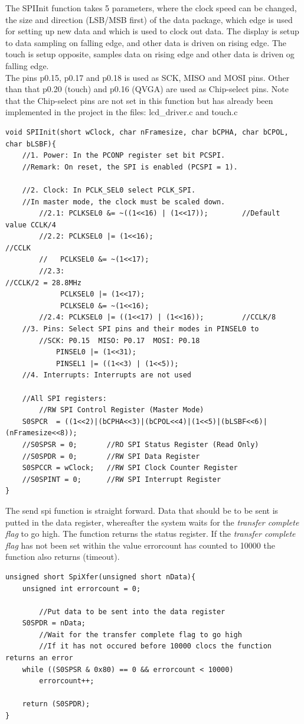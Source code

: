 The SPIInit function takes 5 parameters, where the clock speed can be changed, the size and direction (LSB/MSB first) of the data package,
which edge is used for setting up new data and which is used to clock out data.
The display is setup to data sampling on falling edge, and other data is driven on rising edge. The touch is setup opposite, samples data on rising edge and other data 
is driven og falling edge.
\\ The pins p0.15, p0.17 and p0.18 is used as SCK, MISO and MOSI pins. Other than that p0.20 (touch) and p0.16 (QVGA) are used as Chip-select pins. 
Note that the Chip-select pins are not set in this function but has already been implemented in the project in the files: 
lcd\_driver.c and touch.c
\begin{lstlisting}
void SPIInit(short wClock, char nFramesize, char bCPHA, char bCPOL, char bLSBF){
	//1. Power: In the PCONP register set bit PCSPI.
	//Remark: On reset, the SPI is enabled (PCSPI = 1).

	//2. Clock: In PCLK_SEL0 select PCLK_SPI.
	//In master mode, the clock must be scaled down.
		//2.1: PCLKSEL0 &= ~((1<<16) | (1<<17));		//Default value CCLK/4
		//2.2: PCLKSEL0 |= (1<<16);									//CCLK
		//   PCLKSEL0 &= ~(1<<17);
		//2.3:																			//CCLK/2 = 28.8MHz
			 PCLKSEL0 |= (1<<17);
			 PCLKSEL0 &= ~(1<<16);
		//2.4: PCLKSEL0 |= ((1<<17) | (1<<16)); 		//CCLK/8
	//3. Pins: Select SPI pins and their modes in PINSEL0 to
		//SCK: P0.15  MISO: P0.17  MOSI: P0.18
			PINSEL0 |= (1<<31);
			PINSEL1 |= ((1<<3) | (1<<5));
	//4. Interrupts: Interrupts are not used

	//All SPI registers:
		//RW SPI Control Register (Master Mode)
	S0SPCR	= ((1<<2)|(bCPHA<<3)|(bCPOL<<4)|(1<<5)|(bLSBF<<6)|(nFramesize<<8));
	//S0SPSR = 0;		//RO SPI Status Register (Read Only)
	//S0SPDR = 0;		//RW SPI Data Register
	S0SPCCR = wClock;	//RW SPI Clock Counter Register
	//S0SPINT = 0;		//RW SPI Interrupt Register
}
\end{lstlisting}
The send spi function is straight forward. Data that should be to be sent is putted in the data register, whereafter the system waits for the 
\textit{transfer complete flag} to go high. The function returns the status register. If the \textit{transfer complete flag} has not been set within 
the value errorcount has counted to 10000 the function also returns (timeout).
\begin{lstlisting}
unsigned short SpiXfer(unsigned short nData){
	unsigned int errorcount = 0;

		//Put data to be sent into the data register
	S0SPDR = nData;
		//Wait for the transfer complete flag to go high
		//If it has not occured before 10000 clocs the function returns an error
	while ((S0SPSR & 0x80) == 0 && errorcount < 10000)
		errorcount++;

	return (S0SPDR);
}
\end{lstlisting}
\newpage
